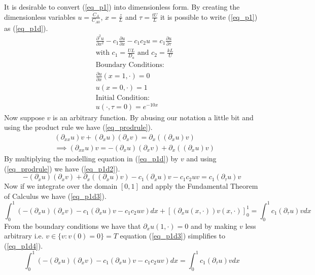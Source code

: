 \documentclass[11pt,fleqn]{article}
\theoremstyle{defstyle}
\begin{document}
It is desirable to convert (\ref{eq_p1}) into dimensionless form. By creating the dimensionless variables $u=\frac{C_A}{C_{A0}}$, $x = \frac{z}{L}$ and $\tau = \frac{tU}{L}$ it is possible to write (\ref{eq_p1}) as (\ref{eq_p1d}).
\begin{equation}
\begin{aligned}
&\frac{\partial^2 u}{\partial x^2} - c_1 \frac{\partial u}{\partial x} - c_1c_2u = 
c_1\frac{\partial u}{\partial \tau} \\
&\text{with } c_1 = \frac{UL}{D_a} \text{ and } c_2 = \frac{kL}{U} \\
&\text{Boundary Conditions:} \\
&\frac{\partial u}{\partial x}(x=1, \cdot) = 0\\
&u(x=0, \cdot) = 1 \\
&\text{Initial Condition:} \\
& u(\cdot, \tau = 0) = e^{-10x}
\end{aligned}
\label{eq_p1d}
\end{equation}
Now suppose $v$ is an arbitrary function. By abusing our notation a little bit and using the product rule we have (\ref{eq_prodrule}).
\begin{equation}
\begin{aligned}
&(\partial_{xx}u)v + (\partial_xu)(\partial_xv) = \partial_x( (\partial_xu)v)\\
&\implies (\partial_{xx}u)v = -(\partial_xu)(\partial_xv) + \partial_x( (\partial_xu)v)
\end{aligned}
\label{eq_prodrule}
\end{equation}
By multiplying the modelling equation in (\ref{eq_p1d}) by $v$ and using (\ref{eq_prodrule}) we have (\ref{eq_p1d2}).
\begin{equation}
 -(\partial_xu)(\partial_xv) + \partial_x( (\partial_xu)v) - c_1(\partial_xu)v - c_1c_2uv = c_1(\partial_{\tau}u)v 
\label{eq_p1d2}
\end{equation}
Now if we integrate over the domain $[0, 1]$ and apply the Fundamental Theorem of Calculus we have (\ref{eq_p1d3}).
\begin{equation}
\int_0^1 (-(\partial_xu)(\partial_xv) - c_1(\partial_xu)v - c_1c_2uv)dx + [(\partial_xu(x, \cdot))v(x, \cdot)]^1_0 = \int^1_0 c_1(\partial_{\tau}u)v dx
\label{eq_p1d3}
\end{equation}
From the boundary conditions we have that $\partial_xu(1,\cdot)=0$ and by making $v$ less arbitrary i.e. $v \in \{v : v(0)=0 \} = T$ equation (\ref{eq_p1d3}) simplifies to (\ref{eq_p1d4}).
\begin{equation}
\int_0^1 (-(\partial_xu)(\partial_xv) - c_1(\partial_xu)v - c_1c_2uv)dx = \int^1_0 c_1(\partial_{\tau}u)v dx
\label{eq_p1d4}
\end{equation}
\end{document}
